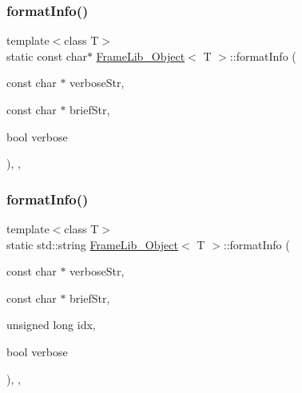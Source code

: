 \subsubsection{\texorpdfstring{format\+Info()}{formatInfo()}\hspace{0.1cm}{\footnotesize\ttfamily [1/3]}}
{\footnotesize\ttfamily template$<$class T$>$ \\
static const char$\ast$ \hyperlink{class_frame_lib___object}{Frame\+Lib\+\_\+\+Object}$<$ T $>$\+::format\+Info (\begin{DoxyParamCaption}\item[{const char $\ast$}]{verbose\+Str,  }\item[{const char $\ast$}]{brief\+Str,  }\item[{bool}]{verbose }\end{DoxyParamCaption})\hspace{0.3cm}{\ttfamily [inline]}, {\ttfamily [static]}, {\ttfamily [protected]}}

\mbox{\label{class_frame_lib___object_aa30676408b8f8161894eb0e533a8522b}} 
\subsubsection{\texorpdfstring{format\+Info()}{formatInfo()}\hspace{0.1cm}{\footnotesize\ttfamily [2/3]}}
{\footnotesize\ttfamily template$<$class T$>$ \\
static std\+::string \hyperlink{class_frame_lib___object}{Frame\+Lib\+\_\+\+Object}$<$ T $>$\+::format\+Info (\begin{DoxyParamCaption}\item[{const char $\ast$}]{verbose\+Str,  }\item[{const char $\ast$}]{brief\+Str,  }\item[{unsigned long}]{idx,  }\item[{bool}]{verbose }\end{DoxyParamCaption})\hspace{0.3cm}{\ttfamily [inline]}, {\ttfamily [static]}, {\ttfamily [protected]}}

\mbox{\label{class_frame_lib___object_a7babe2dd654fbd0c8c05eb7f7ea31550}} 
